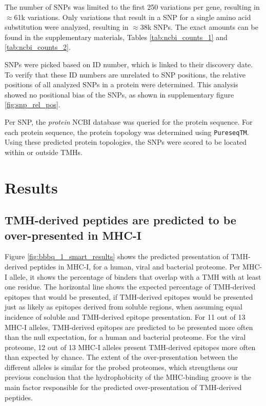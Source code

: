 The number of SNPs was limited to the first 250 variations per gene,
resulting in $\approx$61k variations.
Only variations that result in a SNP for
a single amino acid substitution were analyzed, resulting in $\approx$38k SNPs.
The exact amounts can be found in the supplementary materials,
Tables \ref{tab:ncbi_counts_1} and \ref{tab:ncbi_counts_2}.

%
SNPs were picked based on ID number, which is linked to their discovery date. To verify that these ID numbers are unrelated to SNP positions, the relative positions of all analyzed SNPs in a protein were determined. This analysis showed no positional bias of the SNPs, as shown in supplementary figure \ref{fig:snp_rel_pos}.

Per SNP, the \emph{protein} NCBI database was queried for the
protein sequence. For each protein sequence, the protein topology was determined using \verb;PureseqTM;. Using these predicted protein topologies, the SNPs were scored to be located within or outside TMHs.


\section{Results}

\subsection{TMH-derived peptides are predicted to be over-presented in MHC-I}

Figure \ref{fig:bbbq_1_smart_results} shows the predicted presentation of TMH-derived peptides in MHC-I,
for a human, viral and bacterial proteome.
Per MHC-I allele, it shows the percentage of binders that overlap with a TMH 
with at least one residue.
The horizontal line shows the expected percentage of TMH-derived epitopes 
that would be presented, if TMH-derived epitopes would be presented just as 
likely as epitopes derived from soluble regions,
when assuming equal incidence of soluble and TMH-derived epitope presentation.
For 11 out of 13 MHC-I alleles, TMH-derived epitopes are predicted to be presented more often 
than the null expectation, for a human and bacterial proteome.
For the viral proteome, 12 out of 13 MHC-I alleles present
TMH-derived epitopes more often than expected by chance.
The extent of the over-presentation between the different alleles
is similar for the probed proteomes, 
which strengthens our previous conclusion \cite{bianchi2017} 
that the hydrophobicity of the MHC-binding groove 
is the main factor responsible for the predicted over-presentation 
of TMH-derived peptides.



